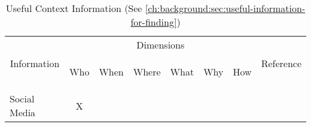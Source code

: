 \begin{table}[tbph]
    \centering
    \caption{Useful Context Information (See
        \autoref{ch:background:sec:useful-information-for-finding})}\label{table:useful-information}
    \begin{minipage}{\textwidth}
        \begin{tabular}{p{3cm}ccccccl}
            \multicolumn{1}{c}{\multirow{2}[3]{*}{Information}}          & \multicolumn{6}{c}{Dimensions}                        & \multicolumn{1}{c}{\multirow{2}[3]{*}{Reference}}                                                                                                                                                                                                                                                                                                                                                                                                                                               \\
            \cmidrule{2-7}                                               & \multicolumn{1}{c}{\begin{sideways}Who\end{sideways}} & \multicolumn{1}{c}{\cellcolor[rgb]{ .906,  .902,  .902}\begin{sideways}When\end{sideways}} & \multicolumn{1}{c}{\begin{sideways}Where\end{sideways}} & \multicolumn{1}{c}{\cellcolor[rgb]{ .906,  .902,  .902}\begin{sideways}What\end{sideways}} & \multicolumn{1}{c}{\begin{sideways}Why\end{sideways}} & \multicolumn{1}{c}{\cellcolor[rgb]{ .906,  .902,  .902}\begin{sideways}How\end{sideways}} &                                                                                         \\
            \midrule
            Social Media                                                 & X                                                                                                                                                                                                                                                                                                                                                                                                                                                                                                                                                       %

\end{tabular}
\end{minipage}
\end{table}
